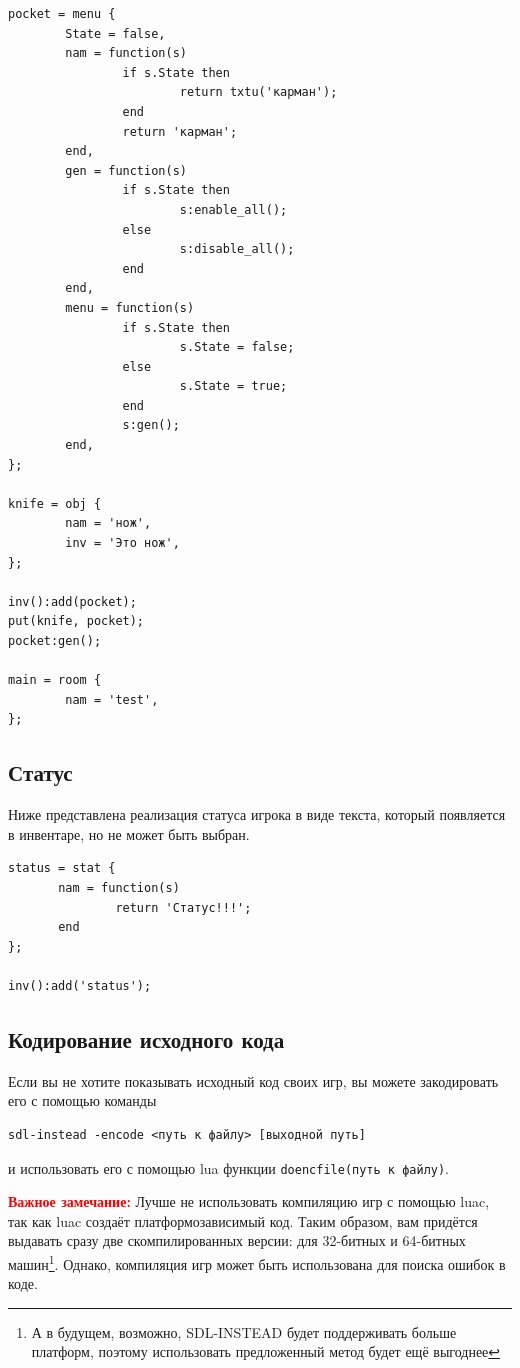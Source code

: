 \documentclass[12pt]{article}
\begin{document}
\begin{verbatim}
pocket = menu {
        State = false,
        nam = function(s)
                if s.State then
                        return txtu('карман');
                end
                return 'карман';
        end,
        gen = function(s)
                if s.State then
                        s:enable_all();
                else
                        s:disable_all();
                end
        end,
        menu = function(s)
                if s.State then
                        s.State = false;
                else
                        s.State = true;
                end
                s:gen();
        end,
};

knife = obj {
        nam = 'нож',
        inv = 'Это нож',
};

inv():add(pocket);
put(knife, pocket);
pocket:gen();

main = room {
        nam = 'test',
};
\end{verbatim}

\subsection{Статус}
Ниже представлена реализация статуса игрока в виде текста, который появляется в инвентаре, но не может быть выбран.

\begin{verbatim}
status = stat {
       nam = function(s)
               return 'Статус!!!';
       end
};

inv():add('status');
\end{verbatim}

\subsection{Кодирование исходного кода}

Если вы не хотите показывать исходный код своих игр, вы можете закодировать его с помощью команды

\begin{verbatim}
sdl-instead -encode <путь к файлу> [выходной путь]
\end{verbatim}

и использовать его с помощью lua функции \verb/doencfile(путь к файлу)/.

\textbf{\textcolor{red}{Важное замечание:}} Лучше не использовать компиляцию игр с помощью luac, так как luac создаёт платформозависимый код. Таким образом, вам придётся выдавать сразу две скомпилированных версии: для 32-битных и 64-битных машин\footnote{А в будущем, возможно, SDL-INSTEAD будет поддерживать больше платформ, поэтому использовать предложенный метод будет ещё выгоднее}. Однако, компиляция игр может быть использована для поиска ошибок в коде.
\end{document}
